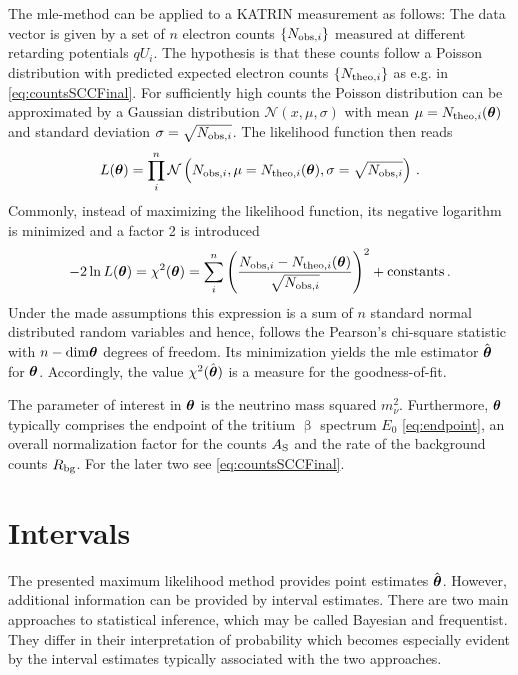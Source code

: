 The \gls{mle}-method can be applied to a KATRIN measurement as follows: The data vector is given by a set of $n$ electron counts $\left\{N_{\mathrm{obs,}i}\right\}$ measured at different retarding potentials $qU_i$. The hypothesis is that these counts follow a Poisson distribution with predicted expected electron counts $\left\{N_{\mathrm{theo,}i}\right\}$ as e.g. in \eqref{eq:countsSCCFinal}. For sufficiently high counts the Poisson distribution can be approximated by a Gaussian distribution $\mathcal{N}(x,\mu, \sigma)$ with mean $\mu=N_{\mathrm{theo,}i}(\boldsymbol{\mathbf{\theta}})$ and standard deviation $\sigma=\sqrt{N_{\mathrm{obs,}i}}$. The likelihood function then reads
\begin{equation}
	\label{eq:KATRINlikelihood}
	L(\boldsymbol{\mathbf{\theta}}) = \prod_{i}^{n} \mathcal{N}\left(N_{\mathrm{obs,}i},\mu=N_{\mathrm{theo,}i}(\boldsymbol{\mathbf{\theta}}), \sigma=\sqrt{N_{\mathrm{obs,}i}}\right)
	\text{\,.}
\end{equation}
Commonly, instead of maximizing the likelihood function, its negative logarithm is minimized and a factor 2 is introduced
\begin{equation}
	\label{eq:katrinChi2}
	-2\ln L(\boldsymbol{\mathbf{\theta}}) = \chi^2(\boldsymbol{\mathbf{\theta}}) = \sum_i^n
		\left( 
			\frac{N_{\mathrm{obs,}i}-N_{\mathrm{theo,}i}(\boldsymbol{\mathbf{\theta}})}{\sqrt{N_{\mathrm{obs,}i}}}
		\right)^2
		 + \mathrm{constants}
		\text{\,.}
\end{equation}
Under the made assumptions this expression is a sum of $n$ standard normal distributed random variables and hence, follows the Pearson's chi-square statistic with $n-\mathrm{dim}\boldsymbol{\mathbf{\theta}}$ degrees of freedom. Its minimization yields the \gls{mle} estimator $\hat{\boldsymbol{\mathbf{\theta}}}$ for $\boldsymbol{\mathbf{\theta}}$. Accordingly, the value $\chi^2(\hat{\boldsymbol{\mathbf{\theta}}})$ is a measure for the goodness-of-fit.

The parameter of interest in $\boldsymbol{\mathbf{\theta}}$ is the neutrino mass squared $m_\nu^2$. Furthermore, $\boldsymbol{\mathbf{\theta}}$ typically comprises the endpoint of the tritium $\upbeta$ spectrum $E_0$ \eqref{eq:endpoint}, an overall normalization factor for the counts $A_\mathrm{S}$ and the rate of the background counts $R_\mathrm{bg}$. For the later two see \eqref{eq:countsSCCFinal}.

\section{Intervals}
The presented maximum likelihood method provides point estimates $\hat{\boldsymbol{\mathbf{\theta}}}$. However, additional information can be provided by interval estimates. There are two main approaches to statistical inference, which may be called Bayesian and frequentist. They differ in their interpretation of probability which becomes especially evident by the interval estimates typically associated with the two approaches.

